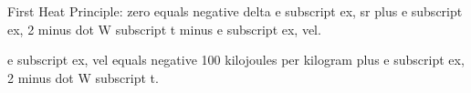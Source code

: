 First Heat Principle: zero equals negative delta e subscript ex, sr plus e subscript ex, 2 minus dot W subscript t minus e subscript ex, vel. 

e subscript ex, vel equals negative 100 kilojoules per kilogram plus e subscript ex, 2 minus dot W subscript t.